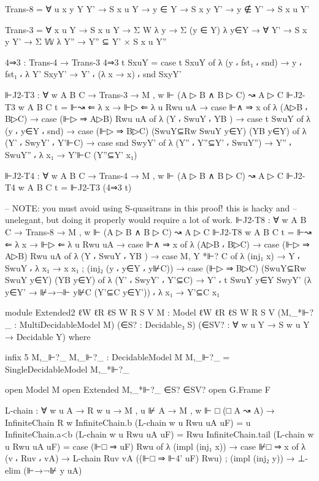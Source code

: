 \begin{spverbatim}
        Trans-8 = ∀ {u x y Y Y'} → S x u Y → y ∈ Y → S x y Y' → y ∉ Y' → S x u Y'

        Trans-3 = ∀ {x u Y} → S x u Y → Σ W λ y → Σ (y ∈ Y) λ y∈Y → ∀ {Y'} → S x y Y' → Σ 𝕎 λ Y''
          → Y'' ⊆ Y' × S x u Y''

        4⇒3 : Trans-4 → Trans-3
        4⇒3 t SxuY = case t SxuY of λ { (y ⸴ fst₁ ⸴ snd) → y ⸴ fst₁ ⸴
          λ { {Y'} SxyY' → Y' ⸴ (λ x → x) ⸴ snd SxyY'}}

        ⊩J2-T3 : ∀ {w A B C} → Trans-3 → M , w ⊩ (A ▷ B ∧ B ▷ C) ↝ A ▷ C
        ⊩J2-T3 {w} {A} {B} {C} t = ⊩↝ ⇐ λ x → ⊩▷ ⇐ λ {u} Rwu uA → case ⊩∧ ⇒ x of
            λ { (A▷B ⸴ B▷C) → case (⊩▷ ⇒ A▷B) Rwu uA of
            λ { (Y ⸴ SwuY ⸴ YB ) → case t SwuY of
            λ { (y ⸴ y∈Y ⸴ snd) → case (⊩▷ ⇒ B▷C) (SwuY⊆Rw SwuY y∈Y) (YB y∈Y) of
            λ { (Y' ⸴ SwyY' ⸴ Y'⊩C) → case snd SwyY' of
            λ { (Y'' ⸴ Y''⊆Y' ⸴ SwuY'') → Y'' ⸴ SwuY'' ⸴ λ {x₁ → Y'⊩C (Y''⊆Y' x₁)}}}}}}

        ⊩J2-T4 : ∀ {w A B C} → Trans-4 → M , w ⊩ (A ▷ B ∧ B ▷ C) ↝ A ▷ C
        ⊩J2-T4 {w} {A} {B} {C} t = ⊩J2-T3 (4⇒3 t)

        -- NOTE: you must avoid using S-quasitrans in this proof! this is hacky and
        -- unelegant, but doing it properly would require a lot of work.
        ⊩J2-T8 : ∀ {w A B C} → Trans-8 → M , w ⊩ (A ▷ B ∧ B ▷ C) ↝ A ▷ C
        ⊩J2-T8 {w} {A} {B} {C} t = ⊩↝ ⇐ λ x → ⊩▷ ⇐ λ {u} Rwu uA → case ⊩∧ ⇒ x of
            λ { (A▷B ⸴ B▷C) → case (⊩▷ ⇒ A▷B) Rwu uA of
            λ { (Y ⸴ SwuY ⸴ YB ) → case M, Y *⊩? C of
            λ { (inj₁ x) → Y ⸴ SwuY ⸴ λ {x₁ → x x₁} ;
            (inj₂ (y ⸴ y∈Y ⸴ y⊮C)) → case (⊩▷ ⇒ B▷C) (SwuY⊆Rw SwuY y∈Y) (YB y∈Y) of
            λ { (Y' ⸴ SwyY' ⸴ Y'⊆C) → Y' ⸴ t SwuY y∈Y SwyY' (λ {y∈Y' → ⊮→¬⊩ y⊮C (Y'⊆C y∈Y')}) ⸴
            λ {x₁ → Y'⊆C x₁}}}}}

  module Extended2
    {ℓW ℓR ℓS}
    {W R S V}
    {M : Model {ℓW} {ℓR} {ℓS} W R S V}
    (M,_*⊩?_ : MultiDecidableModel M)
    (∈S? : Decidable₃ S)
    (∈SV? : ∀ {w u Y} → S w u Y → Decidable Y) where

    infix 5 M,_⊩?_
    M,_⊩?_ : DecidableModel M
    M,_⊩?_ = SingleDecidableModel M,_*⊩?_

    open Model M
    open Extended M,_*⊩?_ ∈S? ∈SV?
    open G.Frame F

    L-chain : ∀ {w u A} → R w u → M , u ⊮ A → M , w ⊩ □ (□ A ↝ A) → InfiniteChain R w
    InfiniteChain.b (L-chain {w} {u} Rwu uA uF) = u
    InfiniteChain.a<b (L-chain {w} {u} Rwu uA uF) = Rwu
    InfiniteChain.tail (L-chain {w} {u} Rwu uA uF) =
      case (⊩□ ⇒ uF) Rwu of
      λ { (impl (inj₁ x)) → case ⊮□ ⇒ x of
        λ { (v ⸴ Ruv ⸴ vA) → L-chain Ruv vA ((⊩□ ⇒ ⊩4' uF) Rwu)}
      ; (impl (inj₂ y)) → ⊥-elim (⊩→¬⊮ y uA) }


\end{spverbatim}
